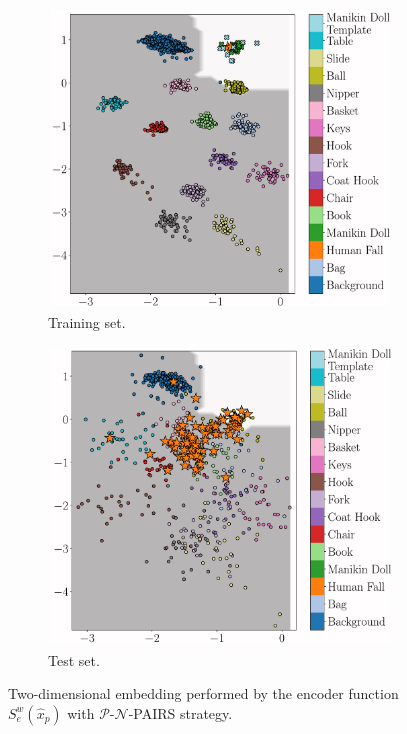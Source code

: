 \begin{figure}[H]
	\centering
	\begin{subfigure}[b]{0.475\textwidth}   
		\centering 
		\includegraphics[width=\textwidth]{img/eeai/embedding/positive_negative_template_pairs/fold_2_train}
		\caption[]%
		{\small Training set.}    
		\label{fig:train-p-n-pairs}
	\end{subfigure}
	\quad
	\begin{subfigure}[b]{0.475\textwidth}   
		\centering 
		\includegraphics[width=\textwidth]{img/eeai/embedding/positive_negative_template_pairs/fold_2_moquette}
		\caption[]%
		{ Test set.}    
		\label{fig:test-p-n-pairs}
	\end{subfigure}
	\caption[]
	{\small Two-dimensional embedding performed by the encoder function $S_e^w(\hat{x}_{p})$ with $\mathcal{P}$-$\mathcal{N}$-PAIRS strategy.} 
	\label{fig:p-n-pairs}
\end{figure}
